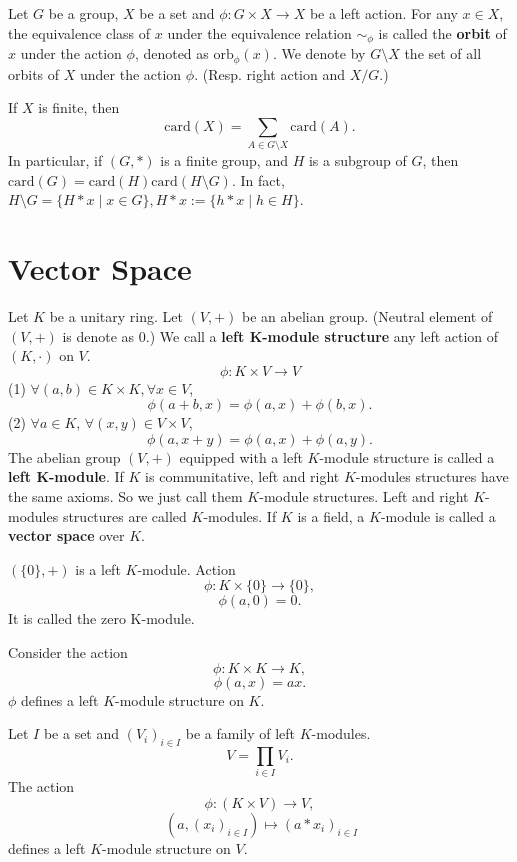 \begin{definitionenv}
    Let $G$ be a group,  $X$ be a set and $\phi:G\times X\longrightarrow X$ be a left action. For any $x\in X$,  the equivalence class of $x$ under the equivalence relation $\sim_{\phi}$ is called the \textbf{orbit} of $x$ under the action $\phi$,  denoted as $\mathrm{orb}_\phi(x)$. We denote by $G\setminus X$ the set of all orbits of $X$ under the action $\phi$. (Resp. right action and $X/G$.)
\end{definitionenv}
\begin{remark}
    If $X$ is finite,  then 
    $$\mathrm{card}(X)=\sum_{A\in G\setminus X}\mathrm{card}(A).$$
    In particular,  if $(G, *)$ is a finite group,  and $H$ is a subgroup of $G$,  then $\mathrm{card}(G)=\mathrm{card}(H)\mathrm{card}(H\setminus G).$ In fact,  $H\setminus G=\{H*x\mid x\in G\}, H*x:=\{h*x\mid h\in H\}.$ 
\end{remark}


\section{Vector Space}
\begin{definitionenv}
    Let $K$ be a unitary ring. Let $(V, +)$ be an abelian group. (Neutral element of $(V, +)$ is denote as $0$.) We call a \textbf{left K-module structure} any left action of $(K, \cdot)$ on $V$. 
    $$\phi:K\times V\longrightarrow V$$
    (1) $\forall (a, b)\in K\times K, \forall x\in V$, $$\phi(a+b, x)=\phi(a, x)+\phi(b, x).$$
    (2) $\forall a\in K$,  $\forall (x, y)\in V\times V$, $$\phi(a, x+y)=\phi(a, x)+\phi(a, y).$$
    The abelian group $(V, +)$ equipped with a left $K$-module structure is called a \textbf{left K-module}. If $K$ is communitative,  left and right $K$-modules structures have the same axioms. So we just call them $K$-module structures. Left and right $K$-modules structures are called $K$-modules.
    If $K$ is a field,  a $K$-module is called a \textbf{vector space} over $K$.
\end{definitionenv}
\begin{exampleenv}
    $(\{0\}, +)$ is a left $K$-module. Action 
    $$\phi:K\times \{0\}\longrightarrow \{0\}, $$
    $$\phi(a, 0)=0.$$
    It is called the zero K-module.
\end{exampleenv}
\begin{exampleenv}
    Consider the action 
    $$\phi:K\times K\longrightarrow K, $$
    $$\phi(a, x)=ax.$$
    $\phi$ defines a left $K$-module structure on $K$.
\end{exampleenv}
\begin{definitionenv}
    Let $I$ be a set and $(V_i)_{i\in I}$ be a family of left $K$-modules.
    $$V=\prod_{i\in I}V_i.$$
    The action 
    $$\phi:(K\times V)\longrightarrow V, $$
    $$\ (a, (x_i)_{i\in I})\longmapsto (a*x_i)_{i\in I}$$
    defines a left $K$-module structure on $V$.
\end{definitionenv}
